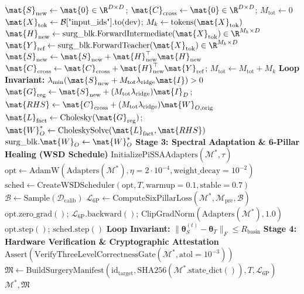 \begin{algorithm}[H]
\begin{algorithmic}[1]
    \STATE $\mat{S}_{\text{new}} \leftarrow \mat{0} \in \R^{D \times D}$; $\mat{C}_{\text{cross}} \leftarrow \mat{0} \in \R^{D \times D}$; $M_{\text{tot}} \leftarrow 0$
        \STATE $\mat{X}_{\text{tok}} \leftarrow \mathcal{B}[\text{"input\_ids"}].\text{to}(\text{dev})$; $M_k \leftarrow \text{tokens}(\mat{X}_{\text{tok}})$
        \STATE $\mat{H}_{\text{new}} \leftarrow \text{surg\_blk}.\text{ForwardIntermediate}(\mat{X}_{\text{tok}}) \in \R^{M_k \times D}$
        \STATE $\mat{Y}_{\text{ref}} \leftarrow \text{surg\_blk}.\text{ForwardTeacher}(\mat{X}_{\text{tok}}) \in \R^{M_k \times D}$
        \STATE $\mat{S}_{\text{new}} \leftarrow \mat{S}_{\text{new}} + \mat{H}_{\text{new}}^\top \mat{H}_{\text{new}}$ 
        \STATE $\mat{C}_{\text{cross}} \leftarrow \mat{C}_{\text{cross}} + \mat{H}_{\text{new}}^\top \mat{Y}_{\text{ref}}$; $M_{\text{tot}} \leftarrow M_{\text{tot}} + M_k$
        \STATE \textbf{Loop Invariant:} $\lambda_{\min}(\mat{S}_{\text{new}} + M_{\text{tot}}\lambda_{\text{ridge}}\mat{I}) > 0$
    \ENDFOR
    \STATE $\mat{G}_{\text{reg}} \leftarrow \mat{S}_{\text{new}} + (M_{\text{tot}}\lambda_{\text{ridge}})\mat{I}_D$; $\mat{RHS} \leftarrow \mat{C}_{\text{cross}} + (M_{\text{tot}}\lambda_{\text{ridge}})\mat{W}_{O,\text{orig}}$
    \STATE $\mat{L}_{\text{fact}} \leftarrow \text{Cholesky}(\mat{G}_{\text{reg}})$; $\mat{W}_O^* \leftarrow \text{CholeskySolve}(\mat{L}_{\text{fact}}, \mat{RHS})$
    \STATE $\text{surg\_blk}.\mat{W}_O \leftarrow \mat{W}_O^*$ 
\ENDFOR
\STATE \textbf{Stage 3: Spectral Adaptation \& 6-Pillar Healing (WSD Schedule)}
\STATE $\text{InitializePiSSAAdapters}(\mathcal{M}^*, \tau)$ 
\STATE $\text{opt} \leftarrow \text{AdamW}(\text{Adapters}(\mathcal{M}^*), \eta=2\cdot 10^{-4}, \text{weight\_decay}=10^{-2})$
\STATE $\text{sched} \leftarrow \text{CreateWSDScheduler}(\text{opt}, T, \text{warmup}=0.1, \text{stable}=0.7)$
    \STATE $\mathcal{B} \leftarrow \text{Sample}(\mathcal{D}_{\text{calib}})$
    \STATE $\mathcal{L}_{\text{6P}} \leftarrow \text{ComputeSixPillarLoss}(\mathcal{M}^*, \mathcal{M}_{\text{pre}}, \mathcal{B})$
    \STATE $\text{opt.zero\_grad}()$; $\mathcal{L}_{\text{6P}}.\text{backward}()$; $\text{ClipGradNorm}(\text{Adapters}(\mathcal{M}^*), 1.0)$
    \STATE $\text{opt.step}()$; $\text{sched.step}()$
    \STATE \textbf{Loop Invariant:} $\|\bm{\theta}_S^{(t)} - \bm{\theta}_T\|_F \le R_{\text{basin}}$
\ENDFOR
\STATE \textbf{Stage 4: Hardware Verification \& Cryptographic Attestation}
\STATE $\text{Assert}(\text{VerifyThreeLevelCorrectnessGate}(\mathcal{M}^*, \text{atol}=10^{-3}))$
\STATE $\mathfrak{M} \leftarrow \text{BuildSurgeryManifest}(\text{id}_{\text{target}}, \text{SHA256}(\mathcal{M}^*.\text{state\_dict}()), T, \mathcal{L}_{\text{6P}})$
\RETURN $\mathcal{M}^*, \mathfrak{M}$
\end{algorithmic}
\end{algorithm}

